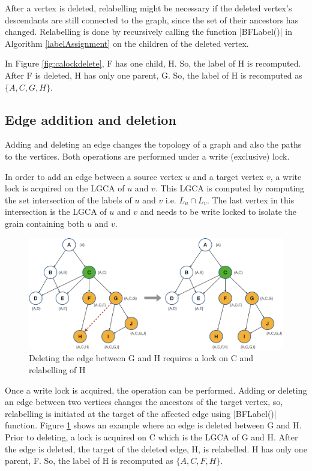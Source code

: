 After a vertex is deleted, relabelling might be necessary if the deleted vertex's descendants are still connected to the graph, since the set of their ancestors has changed. Relabelling is done by recursively calling the function \inline|BFLabel()| in Algorithm \ref{labelAssignment} on the children of the deleted vertex. 

In Figure \ref{fig:calockdelete}, F has one child, H. So, the label of H is recomputed. After F is deleted, H has only one parent, G. So, the label of H is recomputed as $\{A, C, G, H\}$.



\subsection{Edge addition and deletion}
Adding and deleting an edge changes the topology of a graph and also the paths to the vertices. 
Both operations are performed under a write (exclusive) lock. 

In order to add an edge between a source vertex $u$ and a target vertex $v$, a write lock is acquired on the LGCA of $u$ and $v$. This LGCA is computed by computing the set intersection of the labels of $u$ and $v$ i.e. $L_u \cap L_v$. The last vertex in this intersection is the LGCA of $u$ and $v$ and needs to be write locked to isolate the grain containing both $u$ and $v$.

\begin{figure}[h]
	\centering
	\captionsetup{justification=centering}
	\includegraphics[width=\columnwidth]{figures/CALock_Delete_Edge.png}
	\caption{Deleting the edge between G and H requires a lock on C and relabelling of H}
	\label{fig:calockedgedeletion}
\end{figure}

Once a write lock is acquired, the operation can be performed. Adding or deleting an edge between two vertices changes the ancestors of the target vertex, so, relabelling is initiated at the target of the affected edge using \inline|BFLabel()| function. Figure \ref{fig:calockedgedeletion} shows an example where an edge is deleted between G and H. Prior to deleting, a lock is acquired on C which is the LGCA of G and H. After the edge is deleted, the target of the deleted edge, H, is relabelled. H has only one parent, F. So, the label of H is recomputed as $\{A, C, F, H\}$.

